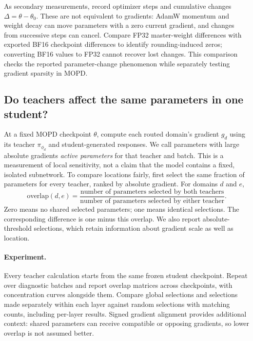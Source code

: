 As secondary measurements, record optimizer steps and cumulative changes
$\Delta=\theta-\theta_0$. These are not equivalent to gradients: AdamW
momentum and weight decay can move parameters with a zero current gradient,
and changes from successive steps can cancel. Compare FP32 master-weight
differences with exported BF16 checkpoint differences to identify
rounding-induced zeros; converting BF16 values to FP32 cannot recover
lost changes. This comparison checks the reported parameter-change
phenomenon while separately testing gradient sparsity in MOPD.

\subsection{Do teachers affect the same parameters in one student?}

At a fixed MOPD checkpoint $\theta$, compute each routed domain's gradient
$g_d$ using its teacher $\pi_{\phi_d}$ and student-generated responses.
We call parameters with large absolute gradients \emph{active parameters}
for that teacher and batch. This is a measurement of local sensitivity,
not a claim that the model contains a fixed, isolated subnetwork.
To compare locations fairly, first select the same fraction of parameters
for every teacher, ranked by absolute gradient. For domains $d$ and $e$,
\begin{equation}
\text{overlap}(d,e)=
\frac{\text{number of parameters selected by both teachers}}
     {\text{number of parameters selected by either teacher}}.
\label{subnet_overlap}
\end{equation}
Zero means no shared selected parameters; one means identical selections.
The corresponding difference is one minus this overlap. We also report
absolute-threshold selections, which retain information about gradient
scale as well as location.

\paragraph{Experiment.}
Every teacher calculation starts from the same frozen student checkpoint.
Repeat over diagnostic batches and report overlap matrices across
checkpoints, with concentration curves alongside them. Compare global
selections and selections made separately within each layer against
random selections with matching counts, including per-layer results.
Signed gradient alignment provides additional context: shared parameters
can receive compatible or opposing gradients, so lower overlap is not
assumed better.

